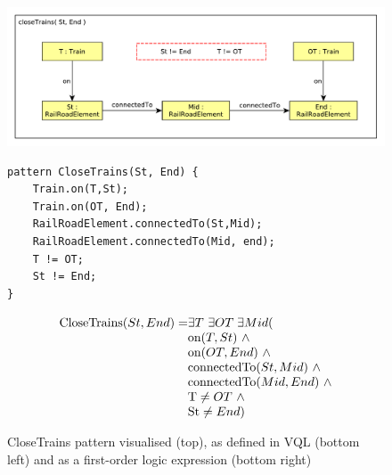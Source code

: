 \begin{figure}[H]
	\begin{center}
		
		\begin{minipage}[c]{\textwidth}
			\begin{minipage}[r]{\textwidth}
				\hfill
				\includegraphics[width=\textwidth]{figures/closeTrains-pattern.pdf}
			\end{minipage}
			\hfill
			\begin{minipage}[c]{0.45\textwidth}
\begin{lstlisting}[language=vql]
pattern CloseTrains(St, End) {
	Train.on(T,St);
	Train.on(OT, End);
	RailRoadElement.connectedTo(St,Mid);
	RailRoadElement.connectedTo(Mid, end);
	T != OT;
	St != End;
}
\end{lstlisting}			
			\end{minipage}
			\hfill
			\begin{minipage}[l]{0.45\textwidth}
				
\begin{equation*}
\begin{array}{@{}r@{}l@{}}

\text{CloseTrains}(St, End) = & \exists{T} \  \exists{OT}\; \exists{Mid} ( \\
& \text{on}(T, St)  \  \wedge \\
& \text{on}(OT, End)  \  \wedge \\
& \text{connectedTo}(St, Mid)  \  \wedge \\
& \text{connectedTo}(Mid, End)  \  \wedge \\
& \text{T} \neq OT  \  \wedge \\
& \text{St} \neq End )
\end{array}
\end{equation*}
			
			\end{minipage}
		\end{minipage}
		\caption{CloseTrains pattern visualised (top), as defined in VQL (bottom left) and as a first-order logic expression (bottom right)}
		\label{fig:pattern-visual}
	\end{center}
\end{figure}



